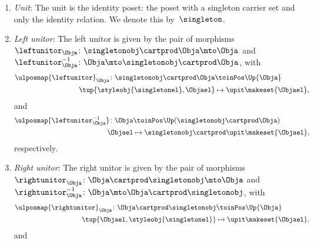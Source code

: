 \begin{lemma}
\begin{enumerate}
        \item \emph{Unit}: The unit is the identity poset: the poset with a singleton carrier set and only the identity relation.
              We denote this by~$\singleton$.
        \item \emph{Left unitor}: The left unitor is given by the pair of morphisms~$\leftunitor_\Obja\colon \singletonobj\cartprod \Obja \mto \Obja$ and~$\leftunitor_\Obja^{-1}\colon \Obja \mto \singletonobj\cartprod \Obja$, with
              \begin{equation}
                  \begin{aligned}
                      \ulposmap{\leftunitor}_\Obja\colon \singletonobj\cartprod \Obja & \toinPos \Up{\Obja} \\
                      \tup{\styleobj{\singletonel},\Objael}                           & \mapsto \upit\makeset{\Objael},
                  \end{aligned}
              \end{equation}
              and
              \begin{equation}
                  \begin{aligned}
                      \ulposmap{\leftunitor_{\Obja}^{-1}}\colon \Obja & \toinPos \Up(\singletonobj\cartprod \Obja) \\
                      \Objael                                         & \mapsto \singletonobj \cartprod \upit \makeset{\Objael},
                  \end{aligned}
              \end{equation}
              respectively.
        \item \emph{Right unitor}: The right unitor is given by the pair of morphisms~$\rightunitor_\Obja\colon \Obja\cartprod \singletonobj  \mto \Obja$ and~$\rightunitor_\Obja^{-1}\colon \Obja \mto \Obja \cartprod \singletonobj$, with
              \begin{equation}
                  \begin{aligned}
                      \ulposmap{\rightunitor}_\Obja\colon \Obja\cartprod \singletonobj & \toinPos \Up{\Obja} \\
                      \tup{\Objael,\styleobj{\singletonel}}                            & \mapsto \upit\makeset{\Objael},
                  \end{aligned}
              \end{equation}
              and
              \begin{equation}
                  \begin{aligned}

\end{aligned}
\end{equation}
\end{enumerate}
\end{lemma}
